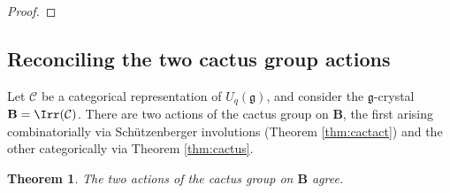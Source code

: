 \documentclass[11pt,reqno]{amsart}
\numberwithin{equation}{section}
\newtheorem{Theorem}[equation]{Theorem}
\theoremstyle{definition}
\theoremstyle{named}
\newcommand{\bB}{\mathbf{B}}
\newcommand{\cC}{\mathcal{C}}
\newcommand{\fg}{\mathfrak{g}}
\newcommand{\oded}[1]{\textcolor{red}{$[\star$ Oded: #1 $\star]$}}
\newcommand{\fsl}{\mathfrak{sl}}
\begin{document}
\begin{proof}
  

%


\end{proof}

\subsection{Reconciling the two cactus group actions}

Let $\cC$ be a categorical representation of $U_q(\fg)$, and consider the $\fg$-crystal $\bB=\Irr(\cC)$.   There are two actions of the cactus group on $\bB$, the first arising combinatorially via  Sch\"utzenberger involutions (Theorem \ref{thm:cactact}) and the other categorically via Theorem \ref{thm:cactus}. 

\begin{Theorem}\label{thm:agree}
The two actions of the cactus group on $\bB$  agree.
\end{Theorem}
\end{document}

